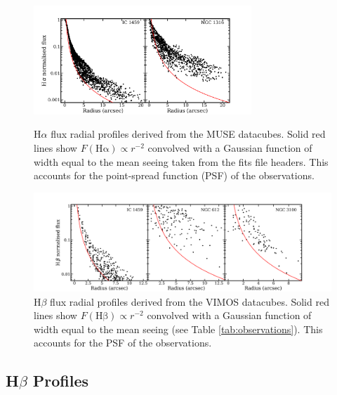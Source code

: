 		\begin{figure}
			\centering
			\includegraphics[width=0.73\textwidth]{chapter5/muse/Halpha_profile.png}
			\caption[MUSE H$\alpha$ radial profiles]{H$\alpha$ flux radial profiles derived from the MUSE datacubes. Solid red lines show $F(\mathrm{H\alpha}) \propto r^{-2}$ convolved with a Gaussian function of width equal to the mean seeing taken from the fits file headers. This accounts for the point-spread function (PSF) of the observations.\label{fig:Ha_profile_MUSE}} 

			\includegraphics[width=1.1\textwidth]{chapter5/vimos/Hbeta_profile.png}
			\caption[VIMOS H$\beta$ radial profiles]{H$\beta$ flux radial profiles derived from the VIMOS datacubes. Solid red lines show $F(\mathrm{H\beta}) \propto r^{-2}$ convolved with a Gaussian function of width equal to the mean seeing (see Table \ref{tab:observations}). This accounts for the PSF of the observations. \label{fig:Hb_profile_VIMOS}} 
		\end{figure}

		\FloatBarrier
	
	\subsection{H$\beta$ Profiles}
		\label{subsec:Hb}
	
